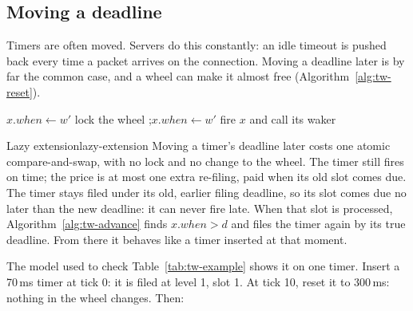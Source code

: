 \subsection{Moving a deadline}

Timers are often moved. Servers do this constantly: an idle timeout is pushed back every time a packet arrives on the connection. Moving a deadline later is by far the common case, and a wheel can make it almost free (Algorithm~\ref{alg:tw-reset}).

\begin{algorithm}[htbp]
    \caption{Moving a timer's deadline to $w'$.}
    \label{alg:tw-reset}
    \begin{algorithmic}[1]
                \State $x.\mathit{when} \gets w'$
                \State \Return
            \EndIf
            \State lock the wheel
            \State {};\enspace $x.\mathit{when} \gets w'$
                \State fire $x$ and call its waker
            \EndIf
        \EndFunction
    \end{algorithmic}
\end{algorithm}

\begin{lemma}{Lazy extension}{lazy-extension}
    Moving a timer's deadline later costs one atomic compare-and-swap, with no lock and no change to the wheel. The timer still fires on time; the price is at most one extra re-filing, paid when its old slot comes due.
    \why The timer stays filed under its old, earlier filing deadline, so its slot comes due no later than the new deadline: it can never fire late. When that slot is processed, Algorithm~\ref{alg:tw-advance} finds $x.\mathit{when} > d$ and files the timer again by its true deadline. From there it behaves like a timer inserted at that moment.
\end{lemma}

The model used to check Table~\ref{tab:tw-example} shows it on one timer. Insert a 70\,ms timer at tick 0: it is filed at level 1, slot 1. At tick 10, reset it to 300\,ms: nothing in the wheel changes. Then:

